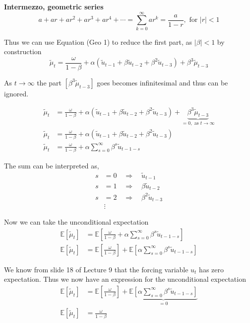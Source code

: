 \documentclass{article}
\begin{document}
\textbf{Intermezzo, geometric series
\[
a+ar+ar^{2}+ar^{3}+ar^{4}+\cdots=\sum_{k=0}^{\infty}ar^{k}=\frac{a}{1-r},\text{ for }|r|<1\tag{Geo 1}
\]
}

Thus we can use Equation (Geo 1) to reduce the first part, as $\rvert\beta\rvert<1$
by construction
\[
\widetilde{\mu}_{t}=\frac{\omega}{1-\beta}+\alpha\left(\widetilde{u}_{t-1}+\beta\widetilde{u}_{t-2}+\beta^{2}\widetilde{u}_{t-3}\right)+\beta^{3}\widetilde{\mu}_{t-3}
\]

As $t\rightarrow\infty$ the part $\left[\beta^{3}\widetilde{\mu}_{t-3}\right]$
goes becomes infinitesimal and thus can be ignored.

\begin{align*}
\widetilde{\mu}_{t} & =\frac{\omega}{1-\beta}+\alpha\left(\widetilde{u}_{t-1}+\beta\widetilde{u}_{t-2}+\beta^{2}\widetilde{u}_{t-3}\right)+\underbrace{\beta^{3}\widetilde{\mu}_{t-3}}_{=0,\text{ as }t\rightarrow\infty}\\
\widetilde{\mu}_{t} & =\frac{\omega}{1-\beta}+\alpha\left(\widetilde{u}_{t-1}+\beta\widetilde{u}_{t-2}+\beta^{2}\widetilde{u}_{t-3}\right)\\
\widetilde{\mu}_{t} & =\frac{\omega}{1-\beta}+\alpha\sum_{s=0}^{\infty}\beta^{s}\widetilde{u}_{t-1-s}
\end{align*}

The sum can be interpreted as,
\begin{align*}
s & =0\quad\Longrightarrow\quad\widetilde{u}_{t-1}\\
s & =1\quad\Longrightarrow\quad\beta\widetilde{u}_{t-2}\\
s & =2\quad\Longrightarrow\quad\beta^{2}\widetilde{u}_{t-3}\\
 & \vdots
\end{align*}

Now we can take the unconditional expectation
\begin{align*}
\mathbb{E}\left[\widetilde{\mu}_{t}\right] & =\mathbb{E}\left[\frac{\omega}{1-\beta}+\alpha\sum_{s=0}^{\infty}\beta^{s}\widetilde{u}_{t-1-s}\right]\\
\mathbb{E}\left[\widetilde{\mu}_{t}\right] & =\mathbb{E}\left[\frac{\omega}{1-\beta}\right]+\mathbb{E}\left[\alpha\sum_{s=0}^{\infty}\beta^{s}\widetilde{u}_{t-1-s}\right]
\end{align*}

We know from slide 18 of Lecture 9 that the forcing variable $u_{t}$
has zero expectation. Thus we now have an expression for the unconditional
expectation
\begin{align*}
\mathbb{E}\left[\widetilde{\mu}_{t}\right] & =\mathbb{E}\left[\frac{\omega}{1-\beta}\right]+\underbrace{\mathbb{E}\left[\alpha\sum_{s=0}^{\infty}\beta^{s}\widetilde{u}_{t-1-s}\right]}_{=0}\\
\mathbb{E}\left[\widetilde{\mu}_{t}\right] & =\frac{\omega}{1-\beta}
\end{align*}
\end{document}
